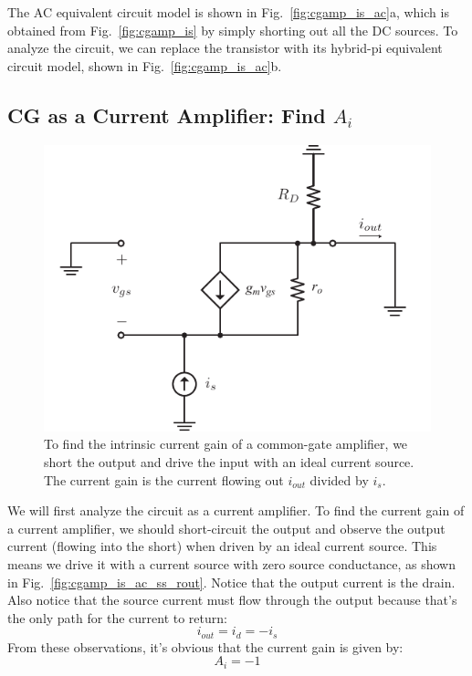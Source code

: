 The AC equivalent circuit model is shown in Fig.~\ref{fig:cgamp_is_ac}a, which is obtained from Fig.~\ref{fig:cgamp_is} by simply shorting out all the DC sources.  To analyze the circuit, we can replace the transistor with its hybrid-pi equivalent circuit model, shown in Fig.~\ref{fig:cgamp_is_ac}b.
\subsection{CG as a Current Amplifier: Find $A_{i}$}
\begin{figure}[tb]
\begin{center}
\includegraphics[scale=.9]{cgamp_is_ac_ss_short}
\end{center}
\caption{To find the intrinsic current gain of a common-gate amplifier, we short the output and drive the input with an ideal current source.  The current gain is the current flowing out $i_{out}$ divided by $i_s$.}
\label{fig:cgamp_is_ac_ss_short}
\end{figure}

We will first analyze the circuit as a current amplifier.  To find the current gain of a current amplifier, we should short-circuit the output and observe the output current (flowing into the short) when driven by an ideal current source.  This means we drive it with a current source with zero source conductance, as shown in Fig.~\ref{fig:cgamp_is_ac_ss_rout}.  Notice that the output current is the drain.  Also notice that the source current must flow through the output because that's the only path for the current to return:
\begin{equation}
	{i_{out}} = {i_d} =  - {i_s}
\end{equation}
From these observations, it's obvious that the current gain is given by:
\begin{equation}
	{A_i} =  - 1
\end{equation}
